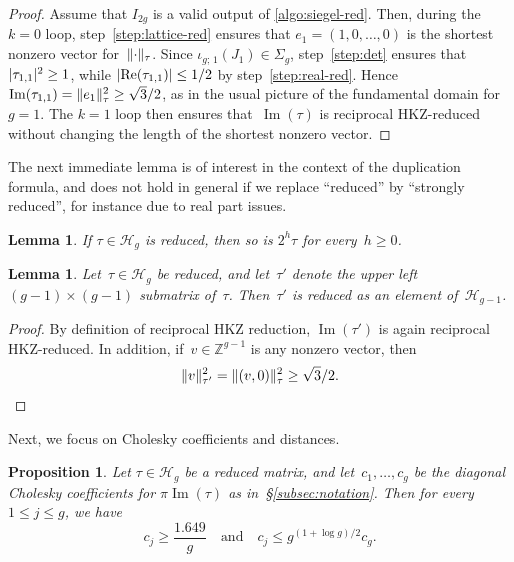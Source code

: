 \documentclass[12pt,oneside]{amsart}
\numberwithin{equation}{section}
\newtheorem{prop}[equation]{Proposition}
\newtheorem{lem}[equation]{Lemma}
\theoremstyle{definition}
\newcommand{\Z}{\mathbb{Z}}
\newcommand{\Half}{\mathcal{H}}
\newcommand{\embedsp}[2]{\iota_{#1;\,#2}}
\DeclareMathOperator{\im}{Im}
\DeclareMathOperator{\re}{Re}
\DeclarePairedDelimiter{\abs}{|}{|}
\DeclarePairedDelimiter{\norm}{\|}{\|}
\begin{document}
\begin{proof}
  Assume that $I_{2g}$ is a valid output of \cref{algo:siegel-red}. Then,
  during the $k=0$ loop, step~\eqref{step:lattice-red} ensures that
  $e_1=(1,0,\ldots,0)$ is the shortest nonzero vector
  for~$\norm{\cdot}_\tau$. Since $\embedsp{g}{1}(J_1)\in \Sigma_g$,
  step~\eqref{step:det} ensures that $\abs{\tau_{1,1}}^2\geq 1$, while
  $\abs{\re(\tau_{1,1})}\leq 1/2$ by step~\eqref{step:real-red}. Hence
  $\im(\tau_{1,1}) = \norm{e_1}_\tau^2 \geq \sqrt{3}/2$, as in the usual
  picture of the fundamental domain for~$g=1$. The $k=1$ loop then ensures
  that~$\im(\tau)$ is reciprocal HKZ-reduced without changing the length of the
  shortest nonzero vector.
\end{proof}

The next immediate lemma is of interest in the context of the duplication
formula, and does not hold in general if we replace ``reduced'' by
``strongly reduced'', for instance due to real part issues.

\begin{lem}
  \label{lem:2-power-red}
  If $\tau\in \Half_g$ is reduced, then so is $2^h\tau$ for every~$h\geq 0$.
\end{lem}

\begin{lem}
  \label{lem:submatrix-red}
  Let~$\tau\in \Half_g$ be reduced, and let~$\tau'$ denote the upper left
  $(g-1)\times (g-1)$ submatrix of~$\tau$. Then~$\tau'$ is reduced as an
  element of~$\Half_{g-1}$.
\end{lem}

\begin{proof}
  By definition of reciprocal HKZ reduction, $\im(\tau')$ is again reciprocal
  HKZ-reduced. In addition, if~$v\in \Z^{g-1}$ is any nonzero vector, then
  \begin{displaymath}
    \norm{v}_{\tau'}^2 = \norm{(v,0)}_{\tau}^2\geq \sqrt{3}/2. \qedhere
  \end{displaymath}
\end{proof}

Next, we focus on Cholesky coefficients and distances.

\begin{prop}
  \label{prop:hkz-bound} Let $\tau\in \Half_g$ be a reduced matrix, and
  let~$c_1,\ldots,c_g$ be the diagonal Cholesky coefficients for $\pi\im(\tau)$
  as in~§\ref{subsec:notation}. Then for every $1\leq j\leq g$, we have
  \begin{displaymath}
    c_j \geq \frac{1.649}{g} \quad \text{and} \quad c_j \leq g^{(1+\log g)/2}c_g.
  \end{displaymath}
\end{prop}
\end{document}
